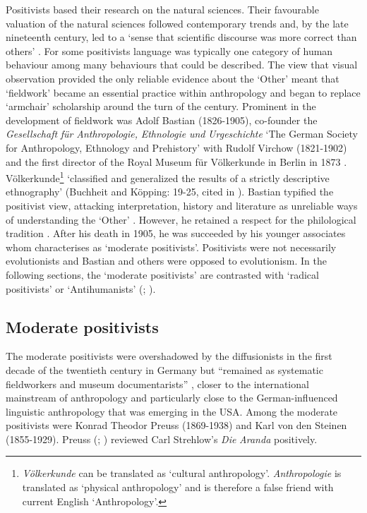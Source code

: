 \documentclass[output=paper]{langsci/langscibook}
\begin{document}
Positivists based their research on the natural sciences. Their favourable valuation of the natural sciences followed contemporary trends and, by the late nineteenth century, led to a ‘sense that scientific discourse was more correct than others’ \citep[154]{crick_explorations_1976}. For some positivists language was typically one category of human behaviour among many behaviours that could be described. The view that visual observation provided the only reliable evidence about the ‘Other’ meant that ‘fieldwork’ became an essential practice within anthropology and began to replace ‘armchair’ scholarship around the turn of the century. Prominent in the development of fieldwork was Adolf Bastian (1826-1905), co-founder the \textit{Gesellschaft} \textit{für} \textit{Anthropologie,} \textit{Ethnologie} \textit{und} \textit{Urgeschichte} ‘The German Society for Anthropology, Ethnology and Prehistory’ with Rudolf Virchow (1821-1902) and the first director of the Royal Museum für Völkerkunde in Berlin in 1873 \citep{kopping_adolf_1983}. Völkerkunde\footnote{ \textrm{\textit{Völkerkunde}} \textrm{can be translated as ‘cultural anthropology’.} \textrm{\textit{Anthropologie}} \textrm{is translated as ‘physical anthropology’ \citep[82]{stocking_virchow_1996} and is therefore a false friend with current English ‘Anthropology’.}} ‘classified and generalized the results of a strictly descriptive ethnography’ (Buchheit and Köpping: 19-25, cited in \citealt[87]{barth_german-speaking_2005}). Bastian typified the positivist view, attacking interpretation, history and literature as unreliable ways of understanding the ‘Other’ \citep[61]{zimmerman_anthropology_2001}. However, he retained a respect for the philological tradition \citep[89]{barth_german-speaking_2005}.  After his death in 1905, he was succeeded by his younger associates whom \citet[91]{barth_german-speaking_2005} characterises as ‘moderate positivists’. Positivists were not necessarily evolutionists and Bastian and others were opposed to evolutionism. In the following sections, the ‘moderate positivists’ \citep[99]{barth_german-speaking_2005} are contrasted with ‘radical positivists’ or ‘Antihumanists’ (\citealt{zimmerman_anthropology_2001}; \citealt{monteath_globalising_2013}). 

\subsection{Moderate positivists}

The moderate positivists were overshadowed by the diffusionists in the first decade of the twentieth century in Germany but “remained as systematic fieldworkers and museum documentarists” \citep[92]{barth_german-speaking_2005}, closer to the international mainstream of anthropology and particularly close to the German-influenced linguistic anthropology that was emerging in the USA. Among the moderate positivists were Konrad Theodor Preuss (1869-1938) and Karl von den Steinen (1855-1929). Preuss (\citeyear{preuss_review_1908}; \citeyear{preuss_geographie_1909}) reviewed Carl Strehlow’s \textit{Die} \textit{Aranda} positively. 
\end{document}
